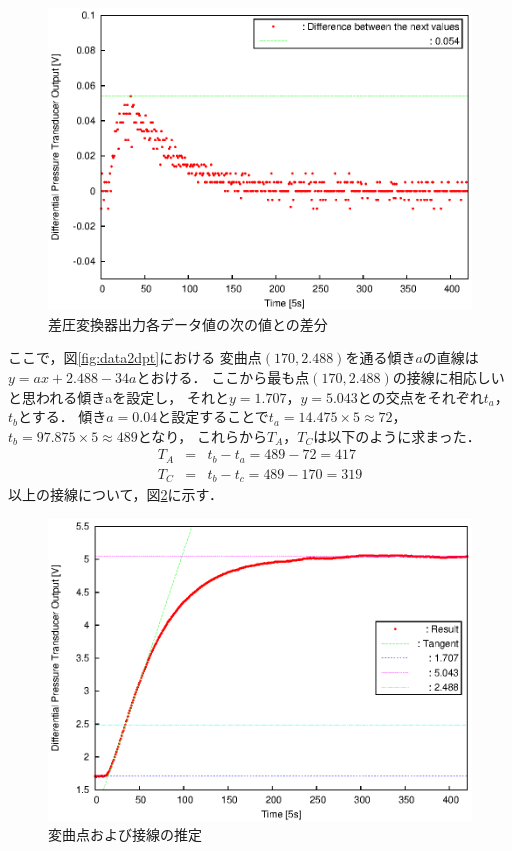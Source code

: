 \documentclass[11pt,a4paper]{jsarticle}
\begin{document}
    \begin{figure}[h]
      \begin{center}
        \includegraphics[width=0.9\hsize]{./fig/data2diff.eps}
      \end{center}
      \caption{差圧変換器出力各データ値の次の値との差分}
      \label{fig:data2diff}
    \end{figure}

    ここで，図\ref{fig:data2dpt}における
    変曲点$(170,2.488)$を通る傾き$a$の直線は$y = a x + 2.488 -34a$とおける．
    ここから最も点$(170,2.488)$の接線に相応しいと思われる傾きaを設定し，
    それと$y = 1.707$，$y = 5.043$との交点をそれぞれ$t_a$，$t_b$とする．
    傾き$a = 0.04$と設定することで$t_a = 14.475 \times 5 \approx 72$，
    $t_b = 97.875 \times 5 \approx 489$となり，
    これらから$T_A$，$T_C$は以下のように求まった．
    \begin{eqnarray}
      T_A &=& t_b - t_a = 489 - 72 = 417 \\
      T_C &=& t_b - t_c = 489 - 170 = 319
    \end{eqnarray}
    以上の接線について，図\ref{fig:data2lines}に示す．\\

    \begin{figure}[h]
      \begin{center}
        \includegraphics[width=0.9\hsize]{./fig/data2lines.eps}
      \end{center}
      \caption{変曲点および接線の推定}
      \label{fig:data2lines}
    \end{figure}
\end{document}
